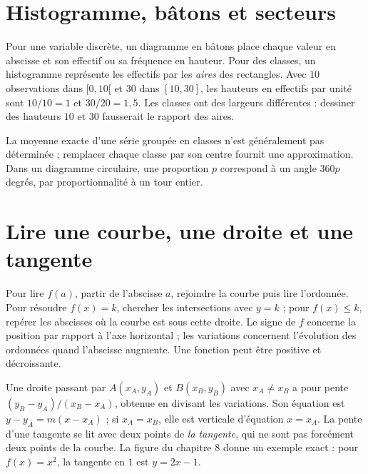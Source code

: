 \documentclass[11pt,a4paper,oneside]{book}
\begin{document}
\section{Histogramme, bâtons et secteurs}
Pour une variable discrète, un diagramme en bâtons place chaque valeur en abscisse
et son effectif ou sa fréquence en hauteur. Pour des classes, un histogramme
représente les effectifs par les \emph{aires} des rectangles.
Avec $10$ observations dans $[0,10[$ et $30$ dans $[10,30]$,
les hauteurs en effectifs par unité sont $10/10=1$ et $30/20=1{,}5$.
Les classes ont des largeurs différentes : dessiner des hauteurs $10$ et $30$
fausserait le rapport des aires.
\begin{center}
\end{center}
La moyenne exacte d'une série groupée en classes n'est généralement pas
déterminée ; remplacer chaque classe par son centre fournit une approximation.
Dans un diagramme circulaire, une proportion $p$ correspond à un angle
$360p$ degrés, par proportionnalité à un tour entier.

\section{Lire une courbe, une droite et une tangente}
Pour lire $f(a)$, partir de l'abscisse $a$, rejoindre la courbe puis lire
l'ordonnée. Pour résoudre $f(x)=k$, chercher les intersections avec $y=k$ ;
pour $f(x)\le k$, repérer les abscisses où la courbe est sous cette droite.
Le signe de $f$ concerne la position par rapport à l'axe horizontal ;
les variations concernent l'évolution des ordonnées quand l'abscisse augmente.
Une fonction peut être positive et décroissante.

Une droite passant par $A(x_A,y_A)$ et $B(x_B,y_B)$ avec $x_A\ne x_B$
a pour pente $(y_B-y_A)/(x_B-x_A)$, obtenue en divisant les variations.
Son équation est $y-y_A=m(x-x_A)$ ; si $x_A=x_B$, elle est verticale
d'équation $x=x_A$. La pente d'une tangente se lit avec deux points de
\emph{la tangente}, qui ne sont pas forcément deux points de la courbe.
La figure du chapitre 8 donne un exemple exact : pour $f(x)=x^2$,
la tangente en $1$ est $y=2x-1$.
\end{document}
